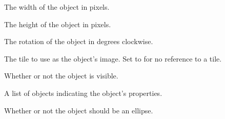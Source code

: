 \documentclass[letterpaper,10pt,english]{sphinxmanual}
\begin{document}
\begin{fulllineitems}
\begin{fulllineitems}
\label{index:tmx.Object.width}
The width of the object in pixels.

\end{fulllineitems}


\begin{fulllineitems}
\label{index:tmx.Object.height}
The height of the object in pixels.

\end{fulllineitems}


\begin{fulllineitems}
\label{index:tmx.Object.rotation}
The rotation of the object in degrees clockwise.

\end{fulllineitems}


\begin{fulllineitems}
\label{index:tmx.Object.gid}
The tile to use as the object's image.  Set to  for
no reference to a tile.

\end{fulllineitems}


\begin{fulllineitems}
\label{index:tmx.Object.visible}
Whether or not the object is visible.

\end{fulllineitems}


\begin{fulllineitems}
\label{index:tmx.Object.properties}
A list of {\hyperref[index:tmx.Property]{\emph{}}} objects indicating the object's
properties.

\end{fulllineitems}


\begin{fulllineitems}
\label{index:tmx.Object.ellipse}
Whether or not the object should be an ellipse.


\end{fulllineitems}
\end{fulllineitems}
\end{document}
